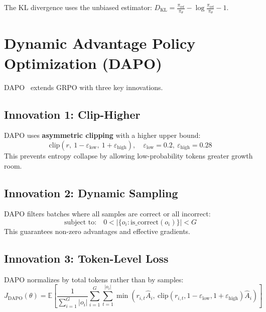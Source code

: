 \documentclass[10pt,twocolumn]{article}
\begin{document}
The KL divergence uses the unbiased estimator: $D_{\text{KL}} = \frac{\pi_{\text{ref}}}{\pi_\theta} - \log\frac{\pi_{\text{ref}}}{\pi_\theta} - 1$.

\section{Dynamic Advantage Policy Optimization (DAPO)}
\label{sec:dapo}

DAPO~\cite{yu2025dapo} extends GRPO with three key innovations.

\subsection{Innovation 1: Clip-Higher}

DAPO uses \textbf{asymmetric clipping} with a higher upper bound:
\begin{equation}
\text{clip}(r,\ 1{-}\varepsilon_{\text{low}},\ 1{+}\varepsilon_{\text{high}}), \quad \varepsilon_{\text{low}}=0.2,\ \varepsilon_{\text{high}}=0.28
\end{equation}
This prevents entropy collapse by allowing low-probability tokens greater growth room.

\subsection{Innovation 2: Dynamic Sampling}

DAPO filters batches where all samples are correct or all incorrect:
\begin{equation}
\text{subject to:} \quad 0 < |\{o_i : \text{is\_correct}(o_i)\}| < G
\end{equation}
This guarantees non-zero advantages and effective gradients.

\subsection{Innovation 3: Token-Level Loss}

DAPO normalizes by total tokens rather than by samples:
\begin{equation}
\boxed{
J_{\text{DAPO}}(\theta) = \mathbb{E}\left[\frac{1}{\sum_{i=1}^{G}|o_i|}\sum_{i=1}^{G}\sum_{t=1}^{|o_i|}\min\left(r_{i,t}\hat{A}_i,\ \text{clip}(r_{i,t}, 1{-}\varepsilon_{\text{low}}, 1{+}\varepsilon_{\text{high}})\hat{A}_i\right)\right]
}
\label{eq:dapo}
\end{equation}
\end{document}
